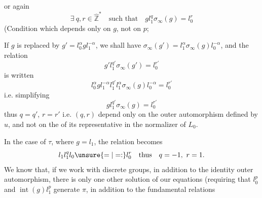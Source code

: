 or again
\[
\exists\ q,r\in\hat{\mathbb Z}^{*}\quad\text{such that}\quad\boxed{gl_1^q\sigma_\infty(g)=l_0^r}
\]
(Condition which depends only on $g$, not on $p$;

If $g$ is replaced by $g'=l_0^\alpha gl_1^{-\alpha}$, we shall have $\sigma_\infty(g')=l_1^\alpha\sigma_\infty(g)l_0^{-\alpha}$, and the relation
\[
g'l_1^{q'}\sigma_\infty(g')=l_0^{r'}
\]
is written
\[
l_0^\alpha gl_1^{-\alpha}l_1^{q'}l_1^\alpha\sigma_\infty(g)l_0^{-\alpha}=l_0^{r'}
\]
i.e. simplifying
\[
gl_1^{q'}\sigma_\infty(g)=l_0^{r'}
\]
thus $q=q'$, $r=r'$ i.e. $(q,r)$ depend only on the outer automorphism defined by $u$, and not on the  of its representative in the normalizer of $L_0$.

In the case of $\tau$, where $g=l_1$, the relation becomes
\[
l_1l_1^ql_0\unsure{=|=:}l_0^r\quad\text{thus}\quad q=-1,\ r=1.
\]
We know that, if we work with discrete groups, in addition to the identity outer automorphism, there is only one other solution of our equations (requiring  that $l_0^p$ and $\operatorname{int}(g)l_1^p$ generate $\pi$, in addition to the fundamental relations
